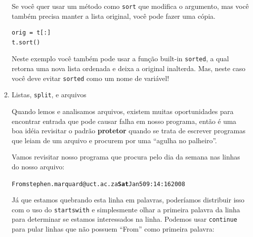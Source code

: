 \begin{enumerate}
Se você quer usar um método como {\tt sort} que modifica
o argumento, mas você também precisa manter a lista original,
você pode fazer uma cópia.



\beforeverb
\begin{verbatim}
orig = t[:]
t.sort()
\end{verbatim}
\afterverb

Neste exemplo você também pode usar a função built-in {\tt sorted},
a qual retorna uma nova lista ordenada e deixa a original inalterda.
Mas, neste caso você deve evitar {\tt sorted} como um nome de variável!


\item Listas, {\tt split}, e arquivos

Quando lemos e analisamos arquivos, existem muitas oportunidades
para encontrar entrada que pode causar falha em nosso programa,
então é uma boa idéia revisitar o padrão {\bf protetor} quando
se trata de escrever programas que leiam de um arquivo e procurem
por uma ``agulha no palheiro''.


Vamos revisitar nosso programa que procura pelo dia da semana
nas linhas do nosso arquivo:


\beforeverb
\begin{alltt}
From stephen.marquard@uct.ac.za {\bf Sat} Jan  5 09:14:16 2008
\end{alltt}
\afterverb

Já que estamos quebrando esta linha em palavras, poderíamos distribuir
isso com o uso do {\tt startswith} e simplesmente olhar a primeira palavra
da linha para determinar se estamos interessados na linha. Podemos usar {\tt continue} 
para pular linhas que não possuem ``From'' como primeira palavra:



\end{enumerate}

